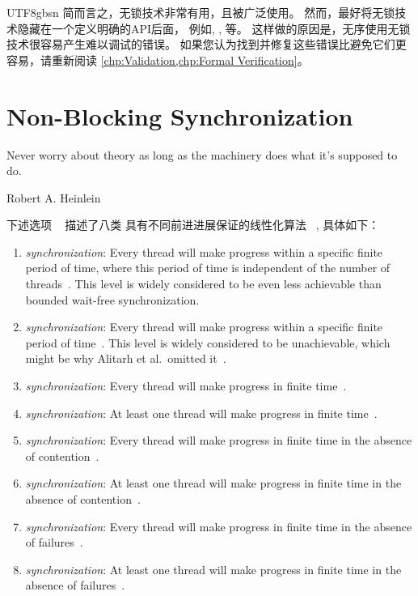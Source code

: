 \begin{CJK}{UTF8}{gbsn}
简而言之，无锁技术非常有用，且被广泛使用。
然而，最好将无锁技术隐藏在一个定义明确的API后面，
例如, , 等。
这样做的原因是，无序使用无锁技术很容易产生难以调试的错误。
如果您认为找到并修复这些错误比避免它们更容易，请重新阅读
\cref{chp:Validation,chp:Formal Verification}。

\section{Non-Blocking Synchronization}
\label{sec:advsync:Non-Blocking Synchronization}
%
\epigraph{Never worry about theory as long as the machinery does what
	  it's supposed to do.}
	 {Robert A. Heinlein}

下述选项 ~\cite{MauriceHerlihy90a}
描述了八类  具有不同前进进展保证的线性化算法
\emph{}~\cite{DanAlitarh2013PracticalProgress},
具体如下：

\begin{enumerate}
\item	\emph{ synchronization}:
	Every thread will make progress within a specific finite period
	of time, where this period of time is independent of the number
	of threads~\cite{HerlihyShavit2008Textbook}.
	This level is widely considered to be even less achievable than
	bounded wait-free synchronization.
\item	\emph{ synchronization}:
	Every thread will make progress within
	a specific finite period of time~\cite{Herlihy91}.
	This level is widely considered to be unachievable, which might be why
	Alitarh et al.\ omitted it~\cite{DanAlitarh2013PracticalProgress}.
\item	\emph{ synchronization}:
	Every thread will make progress
	in finite time~\cite{Herlihy93}.
\item	\emph{ synchronization}:
	At least one thread will
	make progress in finite time~\cite{Herlihy93}.
\item	\emph{ synchronization}:
	Every thread will make progress in finite time in the absence of
	contention~\cite{HerlihyLM03}.
\item	\emph{ synchronization}:
	At least one thread will make progress in finite time in the absence of
	contention~\cite{DanAlitarh2013PracticalProgress}.
\item	\emph{ synchronization}:
	Every thread will make progress in finite time in the absence of
	failures~\cite{DanAlitarh2013PracticalProgress}.
\item	\emph{ synchronization}:
	At least one thread will make progress in finite time in the absence of
	failures~\cite{DanAlitarh2013PracticalProgress}.
\end{enumerate}


\end{CJK}
